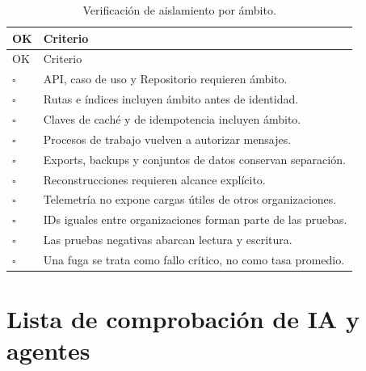 \begin{longtable}{p{1cm}p{12.8cm}}
\caption{Verificación de aislamiento por ámbito.}\label{tab:check-organización}\\
\toprule
OK & Criterio \\
\midrule
\endfirsthead
\toprule
OK & Criterio \\
\midrule
\endhead
$\square$ & API, caso de uso y Repositorio requieren ámbito.\\
$\square$ & Rutas e índices incluyen ámbito antes de identidad.\\
$\square$ & Claves de caché y de idempotencia incluyen ámbito.\\
$\square$ & Procesos de trabajo vuelven a autorizar mensajes.\\
$\square$ & Exports, backups y conjuntos de datos conservan separación.\\
$\square$ & Reconstrucciones requieren alcance explícito.\\
$\square$ & Telemetría no expone cargas útiles de otros organizaciones.\\
$\square$ & IDs iguales entre organizaciones forman parte de las pruebas.\\
$\square$ & Las pruebas negativas abarcan lectura y escritura.\\
$\square$ & Una fuga se trata como fallo crítico, no como tasa promedio.\\
\bottomrule
\end{longtable}

\section{Lista de comprobación de IA y agentes}

